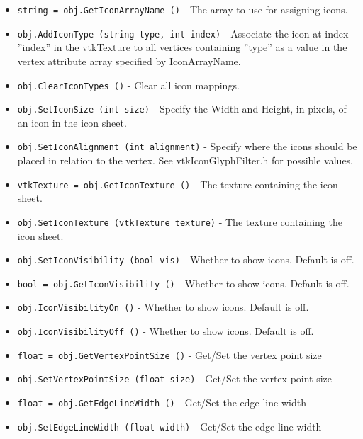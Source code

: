 \begin{itemize}
\item  \verb|string = obj.GetIconArrayName ()| -  The array to use for assigning icons.

\item  \verb|obj.AddIconType (string type, int index)| -  Associate the icon at index ''index'' in the vtkTexture to all vertices
 containing ''type'' as a value in the vertex attribute array specified by
 IconArrayName.

\item  \verb|obj.ClearIconTypes ()| -  Clear all icon mappings.

\item  \verb|obj.SetIconSize (int size)| -  Specify the Width and Height, in pixels, of an icon in the icon sheet.

\item  \verb|obj.SetIconAlignment (int alignment)| -  Specify where the icons should be placed in relation to the vertex.
 See vtkIconGlyphFilter.h for possible values.

\item  \verb|vtkTexture = obj.GetIconTexture ()| -  The texture containing the icon sheet.

\item  \verb|obj.SetIconTexture (vtkTexture texture)| -  The texture containing the icon sheet.

\item  \verb|obj.SetIconVisibility (bool vis)| -  Whether to show icons.  Default is off.

\item  \verb|bool = obj.GetIconVisibility ()| -  Whether to show icons.  Default is off.

\item  \verb|obj.IconVisibilityOn ()| -  Whether to show icons.  Default is off.

\item  \verb|obj.IconVisibilityOff ()| -  Whether to show icons.  Default is off.

\item  \verb|float = obj.GetVertexPointSize ()| -  Get/Set the vertex point size

\item  \verb|obj.SetVertexPointSize (float size)| -  Get/Set the vertex point size

\item  \verb|float = obj.GetEdgeLineWidth ()| -  Get/Set the edge line width

\item  \verb|obj.SetEdgeLineWidth (float width)| -  Get/Set the edge line width


\end{itemize}
